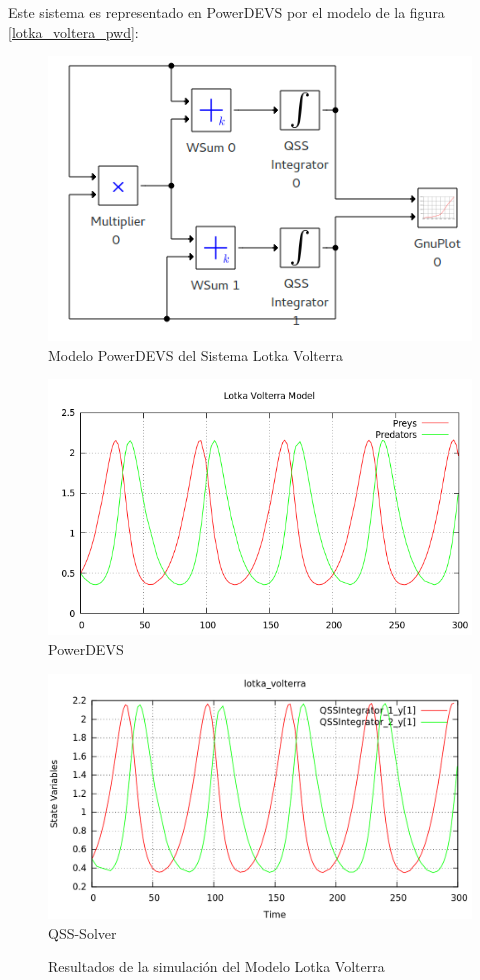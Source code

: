 	Este sistema es representado en PowerDEVS por el modelo de la figura \ref{lotka_voltera_pwd}:

\begin{figure}[H]
\includegraphics[width=0.75\linewidth]{lotka_voltera_pwd}
\caption{Modelo PowerDEVS del Sistema Lotka Volterra}
\label{model:lotka_voltera}
\end{figure}

\begin{figure}[H]
\centering
\begin{minipage}{0.5\textwidth}
\centering
 \includegraphics[width=\linewidth]{lotka_voltera-pd}
PowerDEVS \\
\end{minipage}\hfill
\begin{minipage}{0.5\textwidth}
\centering
 \includegraphics[width=\linewidth]{lotka_voltera-qss}
QSS-Solver \\
\end{minipage}
\label{graph:lotka_voltera}
\caption{Resultados de la simulación del Modelo Lotka Volterra}
\end{figure}

